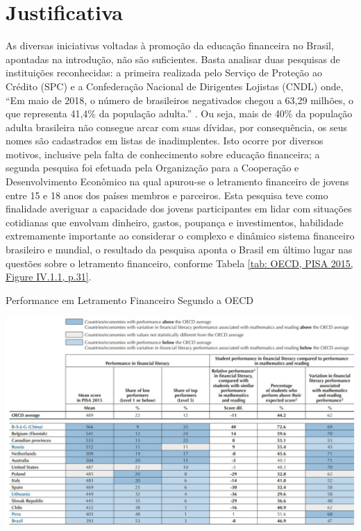\section{Justificativa}
As diversas iniciativas voltadas à promoção da educação financeira no Brasil, apontadas na introdução, não são suficientes. Basta analisar duas pesquisas de instituições reconhecidas: a primeira realizada pelo Serviço de Proteção ao Crédito (SPC) e a Confederação Nacional de Dirigentes Lojistas (CNDL) onde, “Em maio de 2018, o número de brasileiros negativados chegou a 63,29 milhões, o que representa 41,4\% da população adulta.” \cite{spc2018}. Ou seja, mais de 40\% da população adulta brasileira não consegue arcar com suas dívidas, por consequência, os seus nomes são cadastrados em listas de inadimplentes. Isto ocorre por diversos motivos, inclusive pela falta de conhecimento sobre educação financeira; a segunda pesquisa foi efetuada pela Organização para a Cooperação e Desenvolvimento Econômico \cite{oecd2017} na qual apurou-se o letramento financeiro de jovens entre 15 e 18 anos dos países membros e parceiros. Esta pesquisa teve como finalidade averiguar a capacidade dos jovens participantes em lidar com situações cotidianas que envolvam dinheiro, gastos, poupança e investimentos, habilidade extremamente importante ao considerar o complexo e dinâmico sistema financeiro brasileiro e mundial, o resultado da pesquisa aponta o Brasil em último lugar nas questões sobre o letramento financeiro, conforme Tabela \ref{tab: OECD, PISA 2015, Figure IV.1.1, p.31}.

\graphicspath{{tabelas/}}
\begin{table}[!ht]
\centering
\begin{minipage}{1\textwidth}
\caption{Performance em Letramento Financeiro Segundo a OECD}
\centering
\includegraphics[width=1.0\textwidth]{tabela01-pisa2015}
\label{tab: OECD, PISA 2015, Figure IV.1.1, p.31}
\end{minipage}
\end{table}

